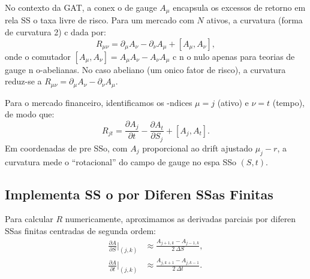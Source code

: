 No contexto da GAT, a conex o de gauge \(A_\mu\) encapsula os excessos de retorno em rela SS o taxa livre de risco. Para um mercado com \(N\) ativos, a curvatura (forma de curvatura 2) c dada por:
\begin{equation}
 R_{\mu\nu} = \partial_\mu A_\nu - \partial_\nu A_\mu + [A_\mu, A_\nu],
\end{equation}
onde o comutador \([A_\mu, A_\nu] = A_\mu A_\nu - A_\nu A_\mu\) c n o nulo apenas para teorias de gauge n o-abelianas. No caso abeliano (um onico fator de risco), a curvatura reduz-se a \(R_{\mu\nu} = \partial_\mu A_\nu - \partial_\nu A_\mu\).

Para o mercado financeiro, identificamos os -ndices \(\mu = j\) (ativo) e \(\nu = t\) (tempo), de modo que:
\begin{equation}
 R_{jt} = \frac{\partial A_j}{\partial t} - \frac{\partial A_t}{\partial S_j} + [A_j, A_t].
\end{equation}
Em coordenadas de pre SSo, com \(A_j\) proporcional ao drift ajustado \(\mu_j - r\), a curvatura mede o ``rotacional'' do campo de gauge no espa SSo \((S, t)\).

\subsection{Implementa SS o por Diferen SSas Finitas}

Para calcular \(R\) numericamente, aproximamos as derivadas parciais por diferen SSas finitas centradas de segunda ordem:
\begin{align}
 \frac{\partial A}{\partial S}\bigg|_{(j,k)} &\approx \frac{A_{j+1,k} - A_{j-1,k}}{2\,\Delta S}, \\
 \frac{\partial A}{\partial t}\bigg|_{(j,k)} &\approx \frac{A_{j,k+1} - A_{j,k-1}}{2\,\Delta t}.
\end{align}

